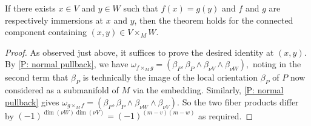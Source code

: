 \begin{lemma}\label{L: im/im}
If there exists $x\in V$ and $y\in W$ such that  $f(x)=g(y)$ and $f$ and $g$ are respectively immersions at $x$ and $y$, then the theorem holds for the connected component containing $(x,y)\in V\times_MW$.
\end{lemma}
\begin{proof}
As observed just above, it suffices to prove the desired identity at $(x,y)$. By \cref{P: normal pullback}, we have
$\omega_{f\times_M g}=(\beta_P,\beta_P\wedge \beta_{\nu V}\wedge \beta_{\nu W}),$ noting in the second term that $\beta_P$ is technically the image of the local orientation $\beta_P$ of $P$ now considered as a submanifold of $M$  via the embedding. Similarly,  \cref{P: normal pullback} gives
$\omega_{g\times_M f}=(\beta_P,\beta_P\wedge \beta_{\nu W}\wedge \beta_{\nu V}).$ So the two fiber products differ by $(-1)^{\dim(\nu W)\dim(\nu V)}=(-1)^{(m-v)(m-w)}$ as required.
\end{proof}

